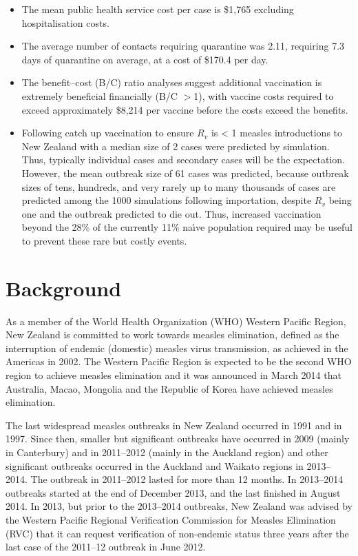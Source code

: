 \documentclass{article}
\begin{document}
\begin{itemize}
\item The mean public health service cost per case is \$1,765 excluding hospitalisation costs.
\item The average number of contacts requiring quarantine was 2.11, requiring 7.3 days of quarantine on average, at a cost of \$170.4 per day.
\item The benefit--cost (B/C) ratio analyses suggest additional vaccination is extremely beneficial financially (B/C $>$1), with vaccine costs required to exceed approximately \$8,214 per vaccine before the costs exceed the benefits.
\item Following catch up vaccination to ensure $R_v$ is < 1 measles introductions to New Zealand with a median size of 2 cases were predicted by simulation. Thus, typically individual cases and secondary cases will be the expectation. However, the mean outbreak size of 61 cases was predicted, because outbreak sizes of tens, hundreds, and very rarely up to many thousands of cases are predicted among the 1000 simulations following importation, despite $R_v$ being one and the outbreak predicted to die out. Thus, increased vaccination beyond the 28\% of the currently 11\% na\'{\i}ve population required may be useful to prevent these rare but costly events.
\end{itemize}

\section{Background}

As a member of the World Health Organization (WHO) Western Pacific Region, New Zealand is committed to work towards measles elimination, defined as the interruption of endemic (domestic) measles virus transmission, as achieved in the Americas in 2002. The Western Pacific Region is expected to be the second WHO region to  achieve measles elimination and it was announced in March 2014 that Australia, Macao, Mongolia and the Republic of Korea have achieved measles elimination.

The last widespread measles outbreaks in New Zealand occurred in 1991 and in 1997. Since then, smaller but significant outbreaks have occurred in 2009 (mainly in Canterbury) and in 2011--2012 (mainly in the Auckland region) and other significant outbreaks occurred in the Auckland and Waikato regions in 2013--2014. The outbreak in 2011--2012 lasted for more than 12 months. In 2013--2014 outbreaks started at the end of December 2013, and the last finished in August 2014. In 2013, but prior to the 2013--2014 outbreaks, New Zealand was advised by the Western Pacific Regional Verification Commission for Measles Elimination (RVC) that it can request verification of non-endemic status three years after the last case of the 2011--12 outbreak in June 2012.
\end{document}

